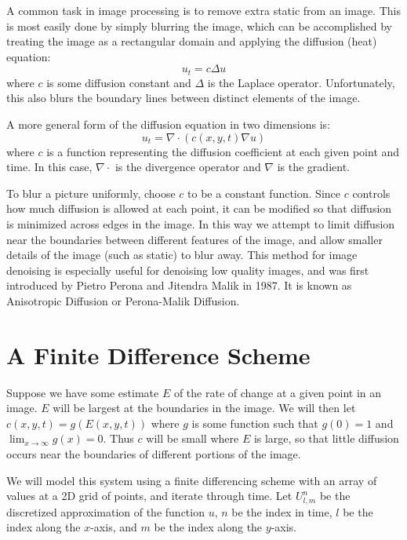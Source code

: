 \label{lab:AnisotropicDiffusion}


A common task in image processing is to remove extra static from an image.
This is most easily done by simply blurring the image, which can be accomplished by  treating the image as a rectangular domain and applying the diffusion (heat) equation:
\[u_t = c \Delta u\]
where $c$ is some diffusion constant and $\Delta$ is the Laplace operator.
Unfortunately, this also blurs the boundary lines between distinct elements of the image.

A more general form of the diffusion equation in two dimensions is:
\[u_t = \nabla\cdot \left( c(x,y,t) \nabla u \right)\]
where $c$ is a function representing the diffusion coefficient at each given point and time.
In this case, $\nabla \cdot$ is the divergence operator and $\nabla$ is the gradient.

To blur a picture uniformly, choose $c$ to be a constant function.
Since $c$ controls how much diffusion is allowed at each point, it can be modified so that diffusion is minimized across edges in the image.
In this way we attempt to limit diffusion near the boundaries between different features of the image, and allow smaller details of the image (such as static) to blur away.
This method for image denoising is especially useful for denoising low quality images, and was first introduced by Pietro Perona and Jitendra Malik in 1987.
It is known as Anisotropic Diffusion or Perona-Malik Diffusion.

\section*{A Finite Difference Scheme}
Suppose we have some estimate $E$ of the rate of change at a given point in an image.
$E$ will be largest at the boundaries in the image.
We will then let $c(x,y,t) = g(E(x,y,t))$ where $g$ is some function such that $g(0)=1$ and $\displaystyle{\lim_{x \to \infty} g(x) = 0}$.
Thus $c$ will be small where $E$ is large, so that little diffusion occurs near the boundaries of different portions of the image.

We will model this system using a finite differencing scheme with an array of values at a 2D grid of points, and iterate through time.
Let $U_{l,m}^n$ be the discretized approximation of the function $u$, $n$ be the index in time, $l$ be the index along the $x$-axis, and $m$ be the index along the $y$-axis.

